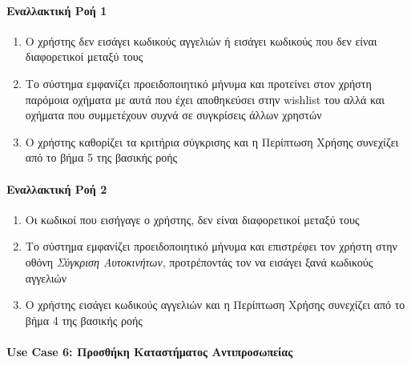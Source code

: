 \documentclass{../ol-softwaremanual}
\begin{document}
	\paragraph{Εναλλακτική Ροή 1}
	
	\begin{enumerate}
		\item Ο χρήστης δεν εισάγει κωδικούς αγγελιών ή εισάγει κωδικούς που δεν είναι διαφορετικοί μεταξύ τους
		\item Το σύστημα εμφανίζει προειδοποιητικό μήνυμα και προτείνει στον χρήστη παρόμοια οχήματα με αυτά που έχει αποθηκεύσει στην \en wishlist \gr του αλλά και οχήματα που συμμετέχουν συχνά σε συγκρίσεις άλλων χρηστών
		\item Ο χρήστης καθορίζει τα κριτήρια σύγκρισης και η Περίπτωση Χρήσης συνεχίζει από το βήμα 5 της βασικής ροής
	\end{enumerate}
	
	\paragraph{Εναλλακτική Ροή 2}
		\begin{enumerate}
			\item Oι κωδικοί που εισήγαγε ο χρήστης, δεν είναι διαφορετικοί μεταξύ τους
			\item Το σύστημα εμφανίζει προειδοποιητικό μήνυμα και επιστρέφει τον χρήστη στην οθόνη \textit{Σύγκριση Αυτοκινήτων}, προτρέποντάς τον να εισάγει ξανά κωδικούς αγγελιών
			\item Ο χρήστης εισάγει κωδικούς αγγελιών και η Περίπτωση Χρήσης συνεχίζει από το βήμα 4 της βασικής ροής		
	\end{enumerate}
	
	
	\paragraph{\en Use Case 6: \gr Προσθήκη Καταστήματος Αντιπροσωπείας}
	
\end{document}
